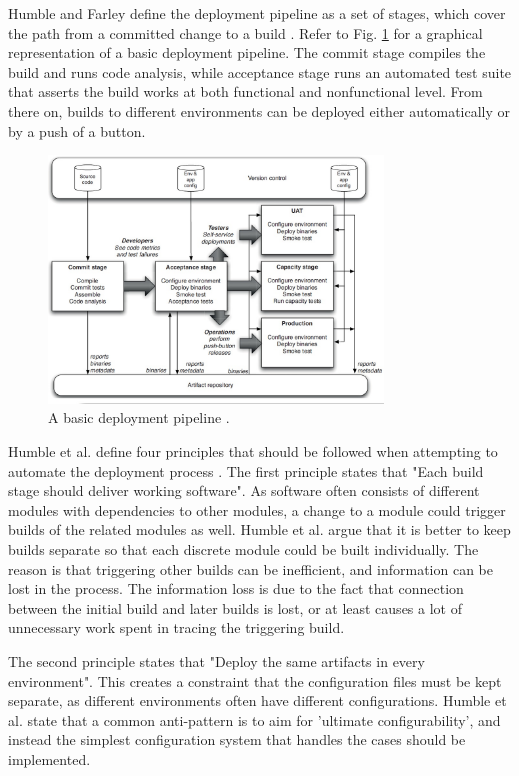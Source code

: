 \documentclass[conference]{IEEEtran}
\begin{document}
Humble and Farley define the deployment pipeline as a set of stages, which cover the path from a committed change to a build \cite{cdbook}. Refer to Fig. \ref{fig2} for a graphical representation of a basic deployment pipeline. The commit stage compiles the build and runs code analysis, while acceptance stage runs an automated test suite that asserts the build works at both functional and nonfunctional level. From there on, builds to different environments can be deployed either automatically or by a push of a button.
\begin{figure}[H]
	\centering
	\includegraphics[width=3.5in]{pipeline.jpg}
	\caption{A basic deployment pipeline \cite{cdbook}.}
	\label{fig2}
\end{figure}

Humble et al. define four principles that should be followed when attempting to automate the deployment process \cite{humble2006deployment}. The first principle states that "Each build stage should deliver working software". As software often consists of different modules with dependencies to other modules, a change to a module could trigger builds of the related modules as well. Humble et al. argue that it is better to keep builds separate so that each discrete module could be built individually. The reason is that triggering other builds can be inefficient, and information can be lost in the process. The information loss is due to the fact that connection between the initial build and later builds is lost, or at least causes a lot of unnecessary work spent in tracing the triggering build. 

The second principle states that "Deploy the same artifacts in every environment". This creates a constraint that the configuration files must be kept separate, as different environments often have different configurations. Humble et al. state that a common anti-pattern is to aim for 'ultimate configurability', and instead the simplest configuration system that handles the cases should be implemented.
\end{document}
